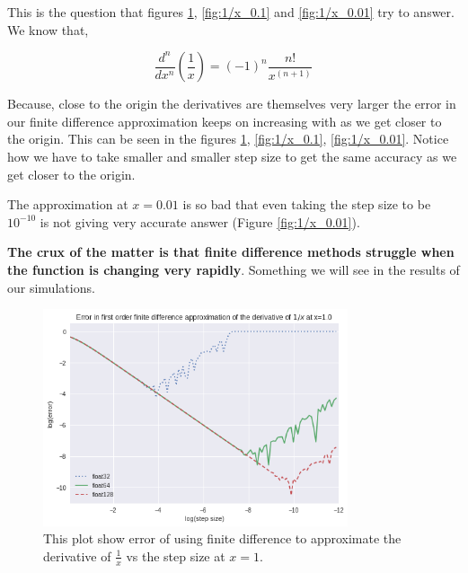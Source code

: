 This is the question that figures \ref{fig:1/x_1}, \ref{fig:1/x_0.1} and \ref{fig:1/x_0.01}  try to answer. We know that,

\begin{equation}
    \frac{d^n}{dx^n}\left(\frac{1}{x}\right) = (-1)^n \frac{n!}{x^{(n+1)}}
\end{equation}

Because, close to the origin the derivatives are themselves very larger the error in our finite difference approximation keeps on increasing with as we get closer to the origin. This can be seen in the figures \ref{fig:1/x_1}, \ref{fig:1/x_0.1}, \ref{fig:1/x_0.01}. Notice how we have to take smaller and smaller step size to get the same accuracy as we get closer to the origin.

The approximation at $x=0.01$ is so bad that even taking the step size to be $10^{-10}$ is not giving very accurate answer (Figure \ref{fig:1/x_0.01}).

\textbf{The crux of the matter is that finite difference methods struggle when the function is changing very rapidly}. Something we will see in the results of our simulations.


\begin{figure}[hbt!]
    \centering
    \includegraphics[width=0.8\textwidth]{images/1_x_error_at_1.png}
    \caption{This plot show error of using finite difference to approximate the derivative of $\frac{1}{x}$ vs the step size at $x = 1$.}
    \label{fig:1/x_1}
\end{figure}

